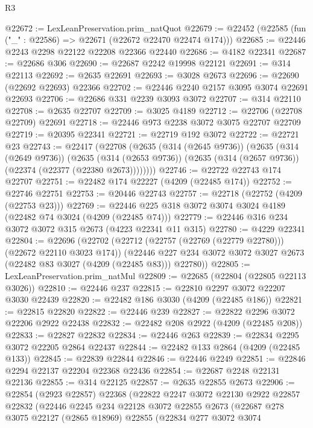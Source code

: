 \begin{lexlean}{R3}
\begin{coremodule}
@22672 := LexLeanPreservation.prim_natQuot
@22679 := @22452 (@22585 (fun ("_" : @22586) => @22671 (@22672 @22470 @22474 @174)))
@22685 := @22446 @2243 @2298 @22122 @22208 @22366 @22440
@22686 := @4182 @22341
@22687 := @22686 @306
@22690 := @22687 @2242 @19998 @22121
@22691 := @314 @22113
@22692 := @2635 @22691
@22693 := @3028 @2673
@22696 := @22690 (@22692 @22693) @22366
@22702 := @22446 @2240 @2157 @3095 @3074 @22691 @22693
@22706 := @22686 @331 @2239 @3093 @3072
@22707 := @314 @22110
@22708 := @2635 @22707
@22709 := @3025 @4189
@22712 := @22706 (@22708 @22709) @22691
@22718 := @22446 @973 @2238 @3072 @3075 @22707 @22709
@22719 := @20395 @22341
@22721 := @22719 @192 @3072
@22722 := @22721 @23
@22743 := @22417
    (@22708
      (@2635
        (@314 (@2645 @9736))
        (@2635
          (@314 (@2649 @9736))
          (@2635
            (@314 (@2653 @9736))
            (@2635 (@314 (@2657 @9736)) (@22374 (@22377 (@22380 @2673))))))))
@22746 := @22722 @22743 @174 @22707
@22751 := @22482 @174 @22227 (@4209 (@22485 @174))
@22752 := @22746 @22751
@22753 := @20446 @22743
@22757 := @22718 (@22752 (@4209 (@22753 @23)))
@22769 := @22446 @225 @318 @3072 @3074 @3024 @4189 (@22482 @74 @3024 (@4209 (@22485 @74)))
@22779 := @22446 @316 @234 @3072 @3072 @315 @2673 (@4223 @22341 @11 @315)
@22780 := @4229 @22341
@22804 := @22696
    (@22702
      (@22712 (@22757 (@22769 (@22779 @22780))) (@22672 @22110 @3023 @174))
      (@22446 @227 @234 @3072 @3072 @3027 @2673 (@22482 @83 @3027 (@4209 (@22485 @83))) @22780))
@22805 := LexLeanPreservation.prim_natMul
@22809 := @22685 (@22804 (@22805 @22113 @3026))
@22810 := @22446 @237
@22815 := @22810 @2297 @3072 @22207 @3030 @22439
@22820 := @22482 @186 @3030 (@4209 (@22485 @186))
@22821 := @22815 @22820
@22822 := @22446 @239
@22827 := @22822 @2296 @3072 @22206 @2922 @22438
@22832 := @22482 @208 @2922 (@4209 (@22485 @208))
@22833 := @22827 @22832
@22834 := @22446 @263
@22839 := @22834 @2295 @3072 @22205 @2864 @22437
@22844 := @22482 @133 @2864 (@4209 (@22485 @133))
@22845 := @22839 @22844
@22846 := @22446 @2249
@22851 := @22846 @2294 @22137 @22204 @22368 @22436
@22854 := @22687 @2248 @22131 @22136
@22855 := @314 @22125
@22857 := @2635 @22855 @2673
@22906 := @22854
    (@2923 @22857)
    @22368
    (@22822
      @2247
      @3072
      @22130
      @2922
      @22857
      @22832
      (@22446
        @2245
        @234
        @22128
        @3072
        @22855
        @2673
        (@22687
          @278
          @3075
          @22127
          (@2865 @18969)
          @22855
          (@22834
            @277
            @3072
            @3074

\end{coremodule}
\end{lexlean}
